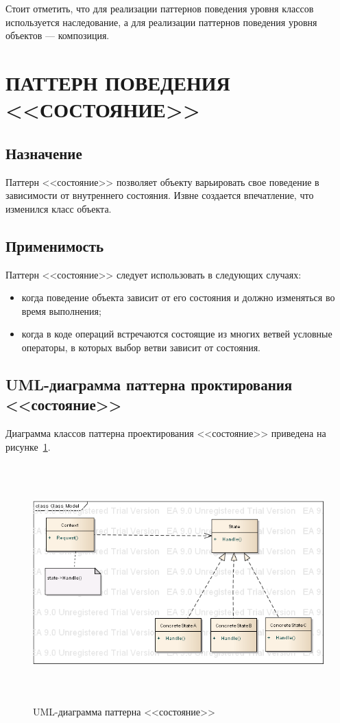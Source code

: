 Стоит отметить, что для реализации паттернов поведения уровня классов используется
наследование, а для реализации паттернов поведения уровня объектов --- композиция.


\section{ПАТТЕРН ПОВЕДЕНИЯ <<СОСТОЯНИЕ>>}

\subsection{Назначение}

Паттерн <<состояние>> позволяет объекту варьировать свое поведение в зависимости
от внутреннего состояния.
Извне создается впечатление, что изменился класс объекта.

\subsection{Применимость}

Паттерн <<состояние>> следует использовать в следующих случаях:

\begin{itemize}
\item
  когда поведение объекта зависит от его состояния и должно изменяться во
  время выполнения;
\item
  когда в коде операций встречаются состоящие из многих ветвей условные
  операторы, в которых выбор ветви зависит от состояния.
\end{itemize}

\subsection{UML-диаграмма паттерна проктирования <<состояние>>}

Диаграмма классов паттерна проектирования <<состояние>> приведена
на рисунке~\ref{pic:UML_state}.

\begin{figure}[htbp]
  \centering
  \includegraphics[width=150mm,height=92mm]{pic/class_model}
  \caption{UML-диаграмма паттерна <<состояние>>}
  \label{pic:UML_state}
\end{figure}

